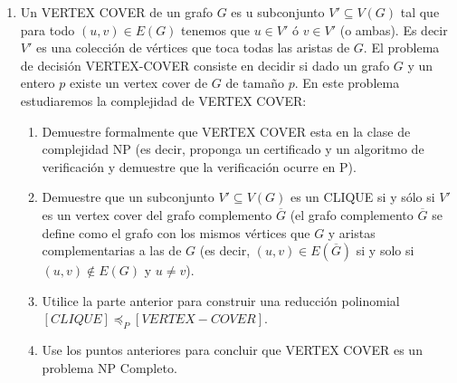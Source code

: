 \documentclass[12pt, a4paper]{article}
\begin{document}
\begin{enumerate}
\item Un VERTEX COVER de un grafo $G$ es u subconjunto $V'\subseteq V(G)$ tal que para todo $(u,v)\in E(G)$ tenemos que $u\in V'$ ó $v\in V'$ (o ambas). Es decir $V'$ es una colección de vértices que toca todas las aristas de $G$. El problema de decisión VERTEX-COVER consiste en decidir si dado un grafo $G$ y un entero $p$ existe un vertex cover de $G$ de tamaño $p$. En este problema estudiaremos la complejidad de VERTEX COVER:
\begin{enumerate}
\item Demuestre formalmente que VERTEX COVER esta en la clase de complejidad NP (es decir, proponga un certificado y un algoritmo de verificación y demuestre que la verificación ocurre en P).
\item Demuestre que un subconjunto $V'\subseteq V(G)$ es un CLIQUE si y sólo si $V'$ es un vertex cover del grafo complemento $\overline{G}$ (el grafo complemento $\overline{G}$ se define como el grafo con los mismos vértices que $G$ y aristas complementarias a las de $G$ (es decir, $(u,v)\in E(\overline{G})$ si y solo si $(u,v)\not\in E(G)$ y $u\neq v$).
\item Utilice la parte anterior para construir una reducción polinomial $[CLIQUE]\preceq_P [VERTEX-COVER]$.
\item Use los puntos anteriores para concluir que VERTEX COVER es un problema NP Completo.
\end{enumerate}





\end{enumerate}
\end{document}
